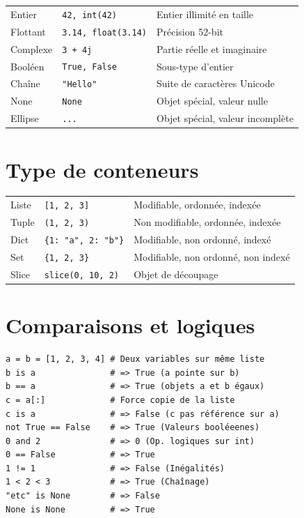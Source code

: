 \documentclass{article}
\begin{document}
\begin{multicols*}{4}
\begin{tabularx}{\columnwidth}{llX}
    Entier & \texttt{42, int(42)} & Entier illimité en taille \\
    Flottant & \texttt{3.14, float(3.14)} & Précision 52-bit \\
    Complexe & \texttt{3 + 4j} & Partie réelle et imaginaire \\
    Booléen & \texttt{True, False} & Sous-type d'entier \\
    Chaîne & \texttt{"Hello"} & Suite de caractères Unicode \\
    None & \texttt{None} & Objet spécial, valeur nulle \\
    Ellipse & \texttt{...} & Objet spécial, valeur incomplète \\
\end{tabularx}

\section*{Type de conteneurs}

\begin{tabularx}{\columnwidth}{llX}
Liste & \texttt{[1, 2, 3]} & Modifiable, ordonnée, indexée \\
Tuple & \texttt{(1, 2, 3)} & Non modifiable, ordonnée, indexée \\
Dict & \texttt{\{1: "a", 2: "b"\}} & Modifiable, non ordonné, indexé \\
Set & \texttt{\{1, 2, 3\}} & Modifiable, non ordonné, non indexé \\
Slice & \texttt{slice(0, 10, 2)} & Objet de découpage \\
\end{tabularx}

\section*{Comparaisons et logiques}

\begin{lstlisting}
a = b = [1, 2, 3, 4] # Deux variables sur même liste
b is a               # => True (a pointe sur b)
b == a               # => True (objets a et b égaux)
c = a[:]             # Force copie de la liste
c is a               # => False (c pas référence sur a)
not True == False    # => True (Valeurs booléeenes)
0 and 2              # => 0 (Op. logiques sur int)
0 == False           # => True
1 != 1               # => False (Inégalités)
1 < 2 < 3            # => True (Chaînage)
"etc" is None        # => False
None is None         # => True
\end{lstlisting}


\end{multicols*}
\end{document}

